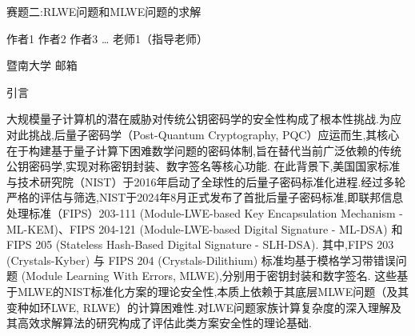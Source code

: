 \documentclass[12pt,a4paper]{article}
\newcommand{\fs}{\CJKfamily{fs}}
\numberwithin{equation}{section}
\begin{document}
\begin{center}
	{\heiti\fontsize{16pt}{24pt}\selectfont 赛题二:RLWE问题和MLWE问题的求解}
\end{center}

\begin{center}
	{\fs\fontsize{12pt}{18pt}\selectfont 作者1 作者2 作者3 … 老师1（指导老师）}
\end{center}

\begin{center}
	{\songti\fontsize{10.5pt}{15.75pt}\selectfont 暨南大学 \; 邮箱}
\end{center}

\vspace{1em}



\vspace{1em}


\vspace{2em}

{\centering\heiti\fontsize{16pt}{24pt}\selectfont 引言\par}
\vspace{1em}


大规模量子计算机的潜在威胁对传统公钥密码学的安全性构成了根本性挑战.为应对此挑战,后量子密码学（Post-Quantum Cryptography, PQC）应运而生,其核心在于构建基于量子计算下困难数学问题的密码体制,旨在替代当前广泛依赖的传统公钥密码学,实现对称密钥封装、数字签名等核心功能.
在此背景下,美国国家标准与技术研究院（NIST）于2016年启动了全球性的后量子密码标准化进程.经过多轮严格的评估与筛选,NIST于2024年8月正式发布了首批后量子密码标准,即联邦信息处理标准（FIPS）203-111 (Module-LWE-based Key Encapsulation Mechanism - ML-KEM)、FIPS 204-121 (Module-LWE-based Digital Signature - ML-DSA) 和 FIPS 205 (Stateless Hash-Based Digital Signature - SLH-DSA).
其中,FIPS 203 (Crystals-Kyber) 与 FIPS 204 (Crystals-Dilithium) 标准均基于模格学习带错误问题 (Module Learning With Errors, MLWE),分别用于密钥封装和数字签名.
这些基于MLWE的NIST标准化方案的理论安全性,本质上依赖于其底层MLWE问题（及其变种如环LWE, RLWE）的计算困难性.对LWE问题家族计算复杂度的深入理解及其高效求解算法的研究构成了评估此类方案安全性的理论基础.
\end{document}
